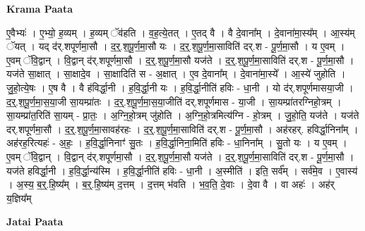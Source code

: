 \documentclass[17pt]{extarticle}
\begin{document}
\textbf{Krama Paata} \newline

ए॒वैभ्यः॑ । ए॒भ्यो॒ ह॒व्यम् । ह॒व्यम् ॅव॑हति । व॒ह॒त्ये॒तत् । ए॒तद् वै । वै दे॒वाना᳚म् । दे॒वाना॑मा॒स्य᳚म् । आ॒स्य॑म् ॅयत् । यद् द॑र्.शपूर्णमा॒सौ । द॒र्॒.श॒पू॒र्ण॒मा॒सौ यः । द॒र्॒.श॒पू॒र्ण॒मा॒साविति॑ दर्.श - पू॒र्ण॒मा॒सौ । य ए॒वम् । ए॒वम् ॅवि॒द्वान् । वि॒द्वान् द॑र्.शपूर्णमा॒सौ । द॒र्॒.श॒पू॒र्ण॒मा॒सौ यज॑ते । द॒र्॒.श॒पू॒र्ण॒मा॒साविति॑ दर्.श - पू॒र्ण॒मा॒सौ । यज॑ते सा॒क्षात् । सा॒क्षादे॒व । सा॒क्षादिति॑ स - अ॒क्षात् । ए॒व दे॒वाना᳚म् । दे॒वाना॑मा॒स्ये᳚ । आ॒स्ये॑ जुहोति । जु॒हो॒त्ये॒षः । ए॒ष वै । वै ह॑विर्द्धा॒नी । ह॒वि॒र्द्धा॒नी यः । ह॒वि॒र्द्धा॒नीति॑ हविः - धा॒नी । यो द॑र्.शपूर्णमासया॒जी । द॒र्॒.श॒पू॒र्ण॒मा॒स॒या॒जी सा॒यम्प्रा॑तः । द॒र्॒.श॒पू॒र्ण॒मा॒स॒या॒जीति॑ दर्.शपूर्णमास - या॒जी । सा॒यम्प्रा॑तरग्निहो॒त्रम् । सा॒यम्प्रा॑त॒रिति॑ सा॒यम् - प्रा॒तः॒ । अ॒ग्नि॒हो॒त्रम् जु॑होति । अ॒ग्नि॒हो॒त्रमित्य॑ग्नि - हो॒त्रम् । जु॒हो॒ति॒ यज॑ते । यज॑ते दर्.शपूर्णमा॒सौ । द॒र्॒.श॒पू॒र्ण॒मा॒सावह॑रहः । द॒र्॒.श॒पू॒र्ण॒मा॒साविति॑ दर्.श - पू॒र्ण॒मा॒सौ । अह॑रहर्. हविर्द्धा॒निना᳚म् । अह॑रह॒रित्यहः॑ - अ॒हः॒ । ह॒वि॒र्द्धा॒निनाꣳ॑ सु॒तः । ह॒वि॒र्द्धा॒निना॒मिति॑ हविः - धा॒निना᳚म् । सु॒तो यः । य ए॒वम् । ए॒वम् ॅवि॒द्वान् । वि॒द्वान् द॑र्.शपूर्णमा॒सौ । द॒र्॒.श॒पू॒र्ण॒मा॒सौ यज॑ते । द॒र्॒.श॒पू॒र्ण॒मा॒साविति॑ दर्.श - पू॒र्ण॒मा॒सौ । यज॑ते हविर्द्धा॒नी । ह॒वि॒र्द्धा॒न्य॑स्मि । ह॒वि॒र्द्धा॒नीति॑ हविः - धा॒नी । अ॒स्मीति॑ । इति॒ सर्व᳚म् । सर्व॑मे॒व । ए॒वास्य॑ । अ॒स्य॒ ब॒र्॒.हि॒ष्य᳚म् । ब॒र्॒.हि॒ष्य॑म् द॒त्तम् । द॒त्तम् भ॑वति । भ॒व॒ति॒ दे॒वाः । दे॒वा वै । वा अहः॑ । अह॑र् य॒ज्ञिय᳚म् \newline

\textbf{Jatai Paata} \newline
\end{document}
